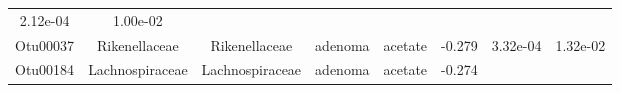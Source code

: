 \documentclass[11pt,]{article}
\begin{document}
\begin{longtable}[]{@{}cccccccc@{}}
\begin{minipage}[t]{0.08\columnwidth}
2.12e-04\strut
\end{minipage} & \begin{minipage}[t]{0.08\columnwidth}\centering\strut
1.00e-02\strut
\end{minipage}\tabularnewline
\begin{minipage}[t]{0.08\columnwidth}\centering\strut
Otu00037\strut
\end{minipage} & \begin{minipage}[t]{0.15\columnwidth}\centering\strut
Rikenellaceae\strut
\end{minipage} & \begin{minipage}[t]{0.15\columnwidth}\centering\strut
Rikenellaceae\strut
\end{minipage} & \begin{minipage}[t]{0.08\columnwidth}\centering\strut
adenoma\strut
\end{minipage} & \begin{minipage}[t]{0.09\columnwidth}\centering\strut
acetate\strut
\end{minipage} & \begin{minipage}[t]{0.07\columnwidth}\centering\strut
-0.279\strut
\end{minipage} & \begin{minipage}[t]{0.08\columnwidth}\centering\strut
3.32e-04\strut
\end{minipage} & \begin{minipage}[t]{0.08\columnwidth}\centering\strut
1.32e-02\strut
\end{minipage}\tabularnewline
\begin{minipage}[t]{0.08\columnwidth}\centering\strut
Otu00184\strut
\end{minipage} & \begin{minipage}[t]{0.15\columnwidth}\centering\strut
Lachnospiraceae\strut
\end{minipage} & \begin{minipage}[t]{0.15\columnwidth}\centering\strut
Lachnospiraceae\strut
\end{minipage} & \begin{minipage}[t]{0.08\columnwidth}\centering\strut
adenoma\strut
\end{minipage} & \begin{minipage}[t]{0.09\columnwidth}\centering\strut
acetate\strut
\end{minipage} & \begin{minipage}[t]{0.07\columnwidth}\centering\strut
-0.274\strut
\end{minipage} & \begin{minipage}[t]{0.08\columnwidth}\centering\strut

\end{minipage}
\end{longtable}
\end{document}
